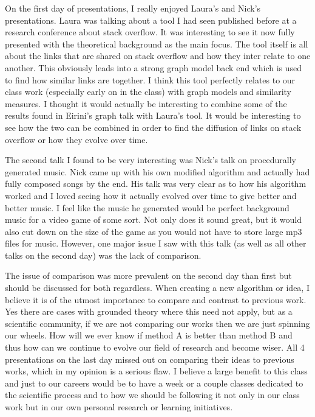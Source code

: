 \documentclass[conference]{IEEEtran}
\begin{document}
On the first day of presentations, I really enjoyed Laura's and Nick's presentations. Laura was talking about a tool
I had seen published before at a research conference about stack overflow. It was interesting to see it now fully
presented with the theoretical background as the main focus. The tool itself is all about the links that are shared
on stack overflow and how they inter relate to one another. This obviously leads into a strong graph model back end which
is used to find how similar links are together. I think this tool perfectly relates to our class work (especially early
on in the class) with graph models and similarity measures. I thought it would actually be interesting to combine
some of the results found in Eirini's graph talk with Laura's tool. It would be interesting to see how the two can
be combined in order to find the diffusion of links on stack overflow or how they evolve over time. 

The second talk I found to be very interesting was Nick's talk on procedurally generated music. Nick came up with his
own modified algorithm and actually had fully composed songs by the end. His talk was very clear as to how his algorithm
worked and I loved seeing how it actually evolved over time to give better and better music. I feel like the music he
generated would be perfect background music for a video game of some sort. Not only does it sound great, but it would
also cut down on the size of the game as you would not have to store large mp3 files for music. However, one major
issue I saw with this talk (as well as all other talks on the second day) was the lack of comparison.

The issue of comparison was more prevalent on the second day than first but should be discussed for both regardless.
When creating a new algorithm or idea, I believe it is of the utmost importance to compare and contrast to previous work.
Yes there are cases with grounded theory where this need not apply, but as a scientific community, if we are not comparing
our works then we are just spinning our wheels. How will we ever know if method A is better than method B and thus how 
can we continue to evolve our field of research and become wiser. All 4 presentations on the last day missed out on
comparing their ideas to previous works, which in my opinion is a serious flaw. I believe a large benefit to this class
and just to our careers would be to have a week or a couple classes dedicated to the scientific process and to how
we should be following it not only in our class work but in our own personal research or learning initiatives.



\balance



\end{document}
